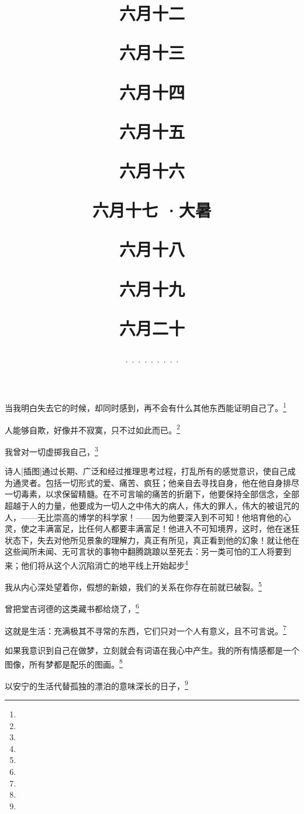 \title{\date[d=17,m=7,y=2024][year:cn-y,年,month:cn,day:cn,日,·,weekday]·六月十二 }
当我明白失去它的时候，却同时感到，再不会有什么其他东西能证明自己了。\footnote{ }

\title{\date[d=18,m=7,y=2024][year:cn-y,年,month:cn,day:cn,日,·,weekday]·六月十三 }
人能够自欺，好像并不寂寞，只不过如此而已。\footnote{ }

\title{\date[d=19,m=7,y=2024][year:cn-y,年,month:cn,day:cn,日,·,weekday]·六月十四 }
我曾对一切虚掷我自己，\footnote{ }

\title{\date[d=20,m=7,y=2024][year:cn-y,年,month:cn,day:cn,日,·,weekday]·六月十五 }
诗人[插图]通过长期、广泛和经过推理思考过程，打乱所有的感觉意识，使自己成为通灵者。包括一切形式的爱、痛苦、疯狂；他亲自去寻找自身，他在他自身排尽一切毒素，以求保留精髓。在不可言喻的痛苦的折磨下，他要保持全部信念，全部超越于人的力量，他要成为一切人之中伟大的病人，伟大的罪人，伟大的被诅咒的人，——无比崇高的博学的科学家！——因为他要深入到不可知！他培育他的心灵，使之丰满富足，比任何人都要丰满富足！他进入不可知境界，这时，他在迷狂状态下，失去对他所见景象的理解力，真正有所见，真正看到他的幻象！就让他在这些闻所未闻、无可言状的事物中翻腾跳踉以至死去：另一类可怕的工人将要到来；他们将从这个人沉陷消亡的地平线上开始起步\footnote{ }

\title{\date[d=21,m=7,y=2024][year:cn-y,年,month:cn,day:cn,日,·,weekday]·六月十六 }
我从内心深处望着你，假想的新娘，我们的关系在你存在前就已破裂。\footnote{ }

\title{\date[d=22,m=7,y=2024][year:cn-y,年,month:cn,day:cn,日,·,weekday]·六月十七 ·大暑}
曾把堂吉诃德的这类藏书都给烧了，\footnote{ }

\title{\date[d=23,m=7,y=2024][year:cn-y,年,month:cn,day:cn,日,·,weekday]·六月十八 }
这就是生活：充满极其不寻常的东西，它们只对一个人有意义，且不可言说。\footnote{ }

\title{\date[d=24,m=7,y=2024][year:cn-y,年,month:cn,day:cn,日,·,weekday]·六月十九 }
如果我意识到自己在做梦，立刻就会有词语在我心中产生。我的所有情感都是一个图像，所有梦都是配乐的图画。\footnote{ }

\title{\date[d=25,m=7,y=2024][year:cn-y,年,month:cn,day:cn,日,·,weekday]·六月二十 }
以安宁的生活代替孤独的漂泊的意味深长的日子，\footnote{ }

